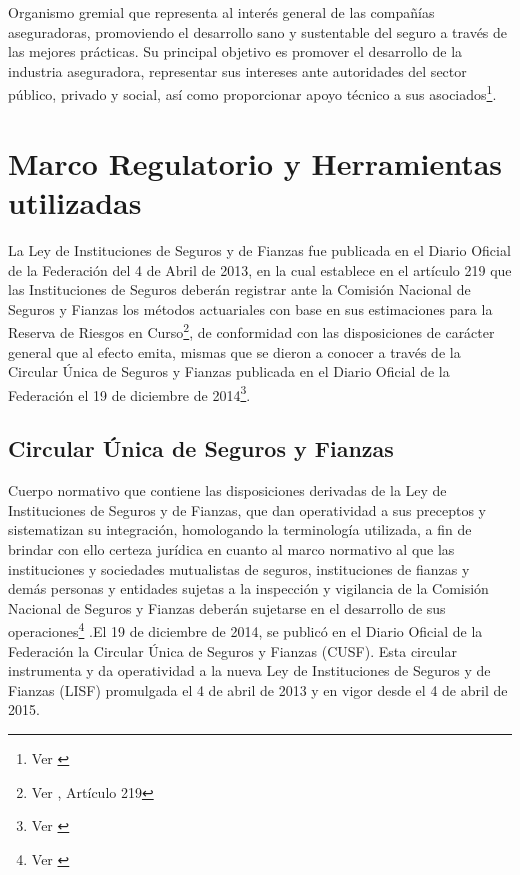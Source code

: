 \documentclass[11pt,twoside,openright,spanish]{report}
\numberwithin{equation}{chapter}
\numberwithin{figure}{chapter}
\numberwithin{table}{chapter}
\begin{document}
	Organismo gremial que representa al interés general de las compañías aseguradoras, promoviendo el desarrollo sano y sustentable del seguro a través de las mejores prácticas. Su principal objetivo es promover el desarrollo de la industria aseguradora, representar sus  intereses ante autoridades del sector público, privado y social, así como proporcionar apoyo técnico a sus asociados\footnote{Ver \citet{FAmis}}. 
	
	\chapter{Marco Regulatorio y Herramientas utilizadas}\label{tcyedb}

	La Ley de Instituciones de Seguros y de Fianzas fue publicada en el Diario Oficial de la Federación del 4 de Abril de 2013, en la cual establece en el artículo 219 que las Instituciones de Seguros deberán registrar ante la Comisión Nacional de Seguros y Fianzas los métodos actuariales con base en sus estimaciones para la Reserva de Riesgos en Curso\footnote{Ver \citet{FAmis}, Artículo 219}, de conformidad con las disposiciones de carácter general que al efecto emita, mismas que se dieron a conocer a través de la Circular Única de Seguros y Fianzas publicada en el Diario Oficial de la Federación el 19 de diciembre de 2014\footnote{Ver \citet{HCusf}}.
	
	\section{Circular Única de Seguros y Fianzas}

	
	Cuerpo normativo que contiene las disposiciones derivadas de la Ley de Instituciones de Seguros y de Fianzas, que dan operatividad a sus preceptos y sistematizan su integración, homologando la terminología utilizada, a fin de brindar con ello certeza jurídica en cuanto al marco normativo al que las instituciones y sociedades mutualistas de seguros, instituciones de fianzas y demás personas y entidades sujetas a la inspección y vigilancia de la Comisión Nacional de Seguros y Fianzas deberán sujetarse en el desarrollo de sus operaciones\footnote{Ver \citet{IDefCusf}} .El 19 de diciembre de 2014, se publicó en el Diario Oficial de la Federación la Circular Única de Seguros y Fianzas (CUSF). Esta circular instrumenta y da operatividad a la nueva Ley de Instituciones de Seguros y de Fianzas (LISF) promulgada el 4 de abril de 2013 y en vigor desde el 4 de abril de 2015. 
	
\end{document}
